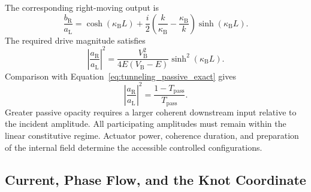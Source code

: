 The corresponding right-moving output is
\begin{equation}
    \boxed{
    \frac{b_{\mathrm R}}{a_{\mathrm L}}
    =\cosh(\kappa_{\mathrm B}L)
    +\frac{i}{2}
    \left(\frac{k}{\kappa_{\mathrm B}}
    -\frac{\kappa_{\mathrm B}}{k}\right)
    \sinh(\kappa_{\mathrm B}L)
    }.
    \label{eq:tunneling_active_output_exact}
\end{equation}
The required drive magnitude satisfies
\begin{equation}
    \left|\frac{a_{\mathrm R}}{a_{\mathrm L}}\right|^2
    =\frac{V_{\mathrm B}^2}{4E(V_{\mathrm B}-E)}
    \sinh^2(\kappa_{\mathrm B}L).
    \label{eq:tunneling_active_drive_magnitude}
\end{equation}
Comparison with Equation~\eqref{eq:tunneling_passive_exact} gives
\begin{equation}
    \boxed{
    \left|\frac{a_{\mathrm R}}{a_{\mathrm L}}\right|^2
    =\frac{1-T_{\mathrm{pass}}}{T_{\mathrm{pass}}}
    }.
    \label{eq:tunneling_active_drive_vs_passive}
\end{equation}
Greater passive opacity requires a larger coherent downstream input relative to the incident amplitude. All participating amplitudes must remain within the linear constitutive regime. Actuator power, coherence duration, and preparation of the internal field determine the accessible controlled configurations.

\subsection{Current, Phase Flow, and the Knot Coordinate}

